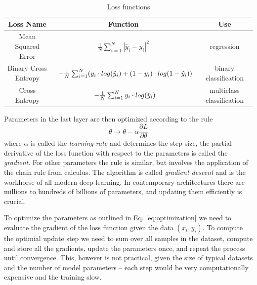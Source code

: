 \begin{table}
    \centering
    \renewcommand{\arraystretch}{1.3}
    \begin{tabular}{|c| c| c|}
    Loss Name & Function & Use \\[0.5ex] \hline
    Mean Squared Error & $\begin{array} {lcl} \frac{1}{N} \sum_{i=1}^N|\hat{y}_i - y_i|^2\end{array}$  & regression \\ [0.5ex]
    Binary Cross Entropy & $\begin{array} {r@{}l@{}} -\frac{1}{N} \sum_{i=1}^N (y_i \cdot log(\hat{y}_i) + (1 - y_i) \cdot log(1-\hat{y}_i)) \end{array}$ & binary classification \\ [0.5ex]
    Cross Entropy & $\begin{array} {r@{}l@{}} -\frac{1}{N} \sum_{i=1}^N y_i \cdot log(\hat{y}_i) \end{array}$ & multiclass classification \\ [0.5ex]
    \end{tabular}
    \caption{Loss functions}
    \label{table:losses}
\end{table}
Parameters in the last layer are then optimized according to the rule
\begin{equation}
    \label{eq:optimization}
    \theta \rightarrow \theta - \alpha \frac{\partial L}{\partial \theta}
\end{equation}
where $\alpha$ is called the \textit{learning rate} and determines the step size, the partial derivative of the loss function with respect to the parameters is called the \textit{gradient}.
For other parameters the rule is similar, but involves the application of the chain rule from calculus.
The algorithm is called \textit{gradient descent} and is the workhorse of all modern deep learning.
In contemporary architectures there are millions to hundreds of billions of parameters, and updating them efficiently is crucial.

To optimize the parameters as outlined in Eq. \ref{eq:optimization} we need to evaluate the gradient of the loss function given the data $(x_i, y_i)$.
To compute the optimial update step we need to sum over all samples in the dataset, compute and store all the gradients, update the parameters once, and repeat the process until convergence.
This, however is not practical, given the size of typical datasets and the number of model parameters -- each step would be very computationally expensive and the training slow.

